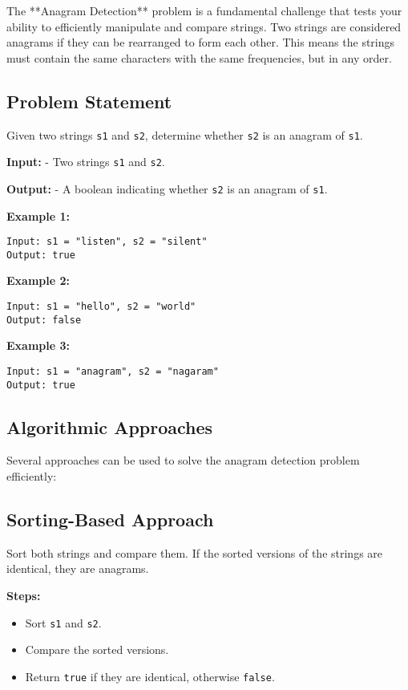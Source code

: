 
\label{problem:Anagram_Detection}

The **Anagram Detection** problem is a fundamental challenge that tests your ability to efficiently manipulate and compare strings. Two strings are considered anagrams if they can be rearranged to form each other. This means the strings must contain the same characters with the same frequencies, but in any order.

\subsection*{Problem Statement}
Given two strings \texttt{s1} and \texttt{s2}, determine whether \texttt{s2} is an anagram of \texttt{s1}.

\textbf{Input:}
- Two strings \texttt{s1} and \texttt{s2}.

\textbf{Output:}
- A boolean indicating whether \texttt{s2} is an anagram of \texttt{s1}.

\textbf{Example 1:}
\begin{verbatim}
Input: s1 = "listen", s2 = "silent"
Output: true
\end{verbatim}

\textbf{Example 2:}
\begin{verbatim}
Input: s1 = "hello", s2 = "world"
Output: false
\end{verbatim}

\textbf{Example 3:}
\begin{verbatim}
Input: s1 = "anagram", s2 = "nagaram"
Output: true
\end{verbatim}

\subsection*{Algorithmic Approaches}
Several approaches can be used to solve the anagram detection problem efficiently:

\subsection*{Sorting-Based Approach}
Sort both strings and compare them. If the sorted versions of the strings are identical, they are anagrams.

\textbf{Steps:}
\begin{itemize}
    \item Sort \texttt{s1} and \texttt{s2}.
    \item Compare the sorted versions.
    \item Return \texttt{true} if they are identical, otherwise \texttt{false}.
\end{itemize}

